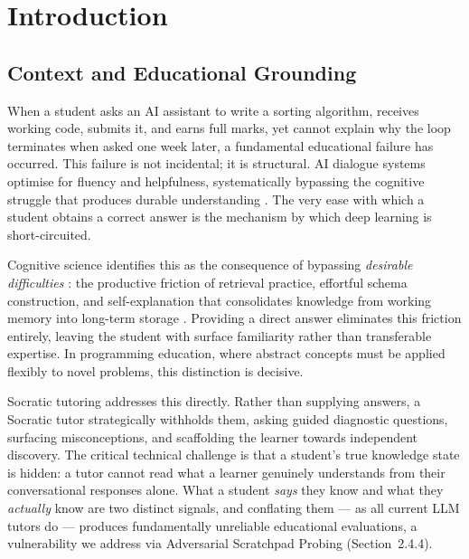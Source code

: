 \documentclass[11pt,a4paper]{report}
\begin{document}
\newpage
\tableofcontents
\newpage


\chapter{Introduction}
\label{ch:intro}

\section{Context and Educational Grounding}
When a student asks an AI assistant to write a sorting algorithm, receives working code, submits it, and earns full marks, yet cannot explain why the loop terminates when asked one week later, a fundamental educational failure has occurred. This failure is not incidental; it is structural. AI dialogue systems optimise for fluency and helpfulness, systematically bypassing the cognitive struggle that produces durable understanding \cite{bjork1994memory}. The very ease with which a student obtains a correct answer is the mechanism by which deep learning is short-circuited.

Cognitive science identifies this as the consequence of bypassing \textit{desirable difficulties} \cite{bjork1994memory}: the productive friction of retrieval practice, effortful schema construction, and self-explanation that consolidates knowledge from working memory into long-term storage \cite{roediger2006test}. Providing a direct answer eliminates this friction entirely, leaving the student with surface familiarity rather than transferable expertise. In programming education, where abstract concepts must be applied flexibly to novel problems, this distinction is decisive.

Socratic tutoring addresses this directly. Rather than supplying answers, a Socratic tutor strategically withholds them, asking guided diagnostic questions, surfacing misconceptions, and scaffolding the learner towards independent discovery. The critical technical challenge is that a student's true knowledge state is hidden: a tutor cannot read what a learner genuinely understands from their conversational responses alone. What a student \textit{says} they know and what they \textit{actually} know are two distinct signals, and conflating them — as all current LLM tutors do — produces fundamentally unreliable educational evaluations, a vulnerability we address via Adversarial Scratchpad Probing (Section~2.4.4).
\end{document}
